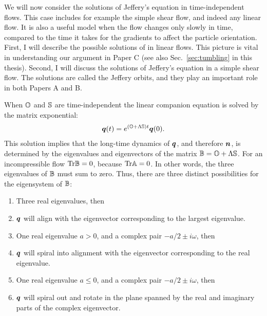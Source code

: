 \documentclass[thesis.tex]{subfiles}
\begin{document}
We will now consider the solutions of Jeffery's equation in time-independent flows. This case includes for example the simple shear flow, and indeed any linear flow. It is also a useful model when the flow changes only slowly in time, compared to the time it takes for the gradients to affect the particle orientation. First, I will describe the possible solutions of  in linear flows. This picture is vital in understanding our argument in Paper C (see also Sec.~\ref{sec:tumbling} in this thesis). Second, I will discuss the solutions of Jeffery's equation in a simple shear flow. The solutions are called the Jeffery orbits, and they play an important role in both Papers A and B.

When $\mathbb{O}$ and $\mathbb{S}$ are time-independent the linear companion equation  is solved by the matrix exponential:
\begin{align*}
		\mbox{\boldmath$q$}(t) = e^{(\mathbb{O} + \Lambda \mathbb{S})t}\mbox{\boldmath$q$}(0).
\end{align*}
This solution implies that the long-time dynamics of $\mbox{\boldmath$q$}$, and therefore $\mbox{\boldmath$n$}$, is determined by the eigenvalues and eigenvectors of the matrix $\mathbb{B} = \mathbb{O} + \Lambda\mathbb{S}$. For an incompressible flow $\mbox{Tr}\mathbb{B}=0$, because $\mbox{Tr}\mathbb{A}=0$. In other words, the three eigenvalues of $\mathbb{B}$ must sum to zero. Thus, there are three distinct possibilities for the eigensystem of $\mathbb{B}$:
\begin{enumerate}
	\item Three real eigenvalues, then
	\item[] $\mbox{\boldmath$q$}$ will align with the eigenvector corresponding to the largest eigenvalue.
	\item One real eigenvalue $a>0$, and a complex pair $-a/2 \pm i\omega$, then
	\item[] $\mbox{\boldmath$q$}$ will spiral into alignment with the eigenvector corresponding to the real eigenvalue.
	\item One real eigenvalue $a\leq0$, and a complex pair $-a/2 \pm i\omega$, then
	\item[] $\mbox{\boldmath$q$}$ will spiral out and rotate in the plane spanned by the real and imaginary parts of the complex eigenvector.
\end{enumerate}
\end{document}
